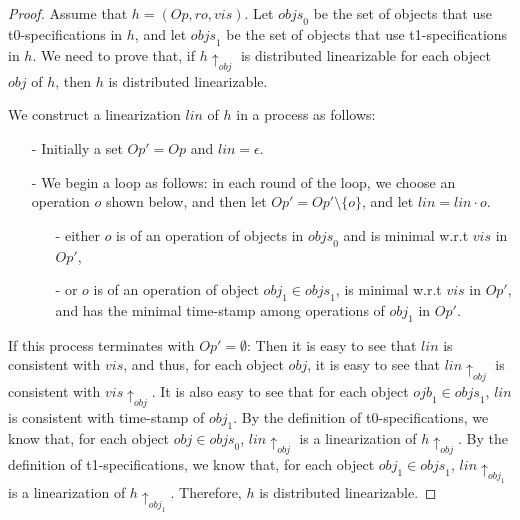 {\composingTZeroAndTOne*
\begin {proof}
Assume that $h = (\mathit{Op},\mathit{ro},\mathit{vis})$. Let $\mathit{objs}_0$ be the set of objects that use t0-specifications in $h$, and let $\mathit{objs}_1$ be the set of objects that use t1-specifications in $h$. We need to prove that, if $h \uparrow_{\mathit{obj}}$ is distributed linearizable for each object $\mathit{obj}$ of $h$, then $h$ is distributed linearizable.

We construct a linearization $\mathit{lin}$ of $h$ in a process as follows:

\begin{itemize}
\setlength{\itemsep}{0.5pt}
\item[-] Initially a set $\mathit{Op}' = \mathit{Op}$ and $\mathit{lin} = \epsilon$.

\item[-] We begin a loop as follows: in each round of the loop, we choose an operation $o$ shown below, and then let $\mathit{Op}' = \mathit{Op}' \setminus \{ o \}$, and let $\mathit{lin} = \mathit{lin} \cdot o$.

    \begin{itemize}
    \setlength{\itemsep}{0.5pt}
    \item[-] either $o$ is of an operation of objects in $\mathit{objs}_0$ and is minimal w.r.t $\mathit{vis}$ in $\mathit{Op}'$,

    \item[-] or $o$ is of an operation of object $\mathit{obj}_1 \in \mathit{objs}_1$, is minimal w.r.t $\mathit{vis}$ in $\mathit{Op}'$, and has the minimal time-stamp among operations of $\mathit{obj}_1$ in $\mathit{Op}'$.
    \end{itemize}
\end{itemize}

If this process terminates with $\mathit{Op}' = \emptyset$: Then it is easy to see that $\mathit{lin}$ is consistent with $\mathit{vis}$, and thus, for each object $\mathit{obj}$, it is easy to see that $\mathit{lin} \uparrow_{\mathit{obj}}$ is consistent with $\mathit{vis} \uparrow_{\mathit{obj}}$. It is also easy to see that for each object $\mathit{ojb}_1 \in \mathit{objs}_1$, $\mathit{lin}$ is consistent with time-stamp of $\mathit{obj}_1$. By the definition of t0-specifications, we know that, for each object $\mathit{obj} \in \mathit{objs}_0$, $\mathit{lin} \uparrow_{\mathit{obj}}$ is a linearization of $h \uparrow_{\mathit{obj}}$. By the definition of t1-specifications, we know that, for each object $\mathit{obj}_1 \in \mathit{objs}_1$, $\mathit{lin} \uparrow_{\mathit{obj}_1}$ is a linearization of $h \uparrow_{\mathit{obj}_1}$. Therefore, $h$ is distributed linearizable.


\end{proof}}
